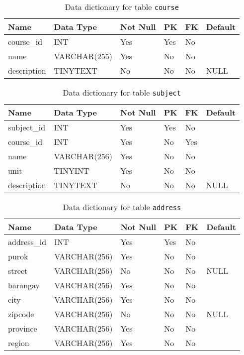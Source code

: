 \documentclass{article}
\newcommand{\tname}[1]{\color{blue}\texttt{#1}}
\begin{document}
\begin{table}[H]
    \centering
    \begin{tabularx}{\textwidth}{m{1.0in}Xllll}
        \hline
        Name        & Data Type    & Not Null & PK  & FK & Default \\ \hline
        course\_id  & INT          & Yes      & Yes & No & ~       \\
        name        & VARCHAR(255) & Yes      & No  & No & ~       \\
        description & TINYTEXT     & No       & No  & No & NULL    \\
    \end{tabularx}
    \caption{Data dictionary for table \tname{course}}
\end{table}

\begin{table}[H]
    \centering
    \begin{tabularx}{\textwidth}{m{1.0in}Xllll}
        \hline
        Name        & Data Type    & Not Null & PK  & FK  & Default \\ \hline
        subject\_id & INT          & Yes      & Yes & No  & ~       \\
        course\_id  & INT          & Yes      & No  & Yes & ~       \\
        name        & VARCHAR(256) & Yes      & No  & No  & ~       \\
        unit        & TINYINT      & Yes      & No  & No  & ~       \\
        description & TINYTEXT     & No       & No  & No  & NULL    \\
    \end{tabularx}
    \caption{Data dictionary for table \tname{subject}}
\end{table}

\begin{table}[H]
    \centering
    \begin{tabularx}{\textwidth}{m{1.0in}Xllll}
        \hline
        Name        & Data Type    & Not Null & PK  & FK & Default \\ \hline
        address\_id & INT          & Yes      & Yes & No & ~       \\
        purok       & VARCHAR(256) & Yes      & No  & No & ~       \\
        street      & VARCHAR(256) & No       & No  & No & NULL    \\
        barangay    & VARCHAR(256) & Yes      & No  & No & ~       \\
        city        & VARCHAR(256) & Yes      & No  & No & ~       \\
        zipcode     & VARCHAR(256) & No       & No  & No & NULL    \\
        province    & VARCHAR(256) & Yes      & No  & No & ~       \\
        region      & VARCHAR(256) & Yes      & No  & No & ~       \\
    \end{tabularx}
    \caption{Data dictionary for table \tname{address}}
\end{table}
\end{document}
